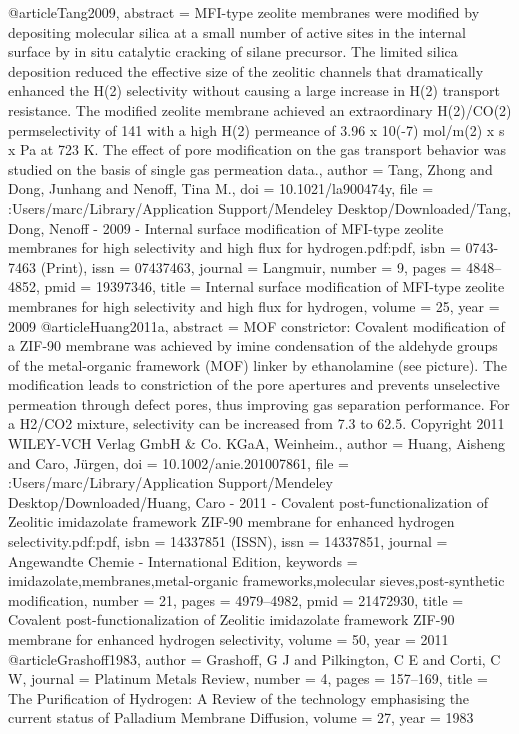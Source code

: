 @article{Tang2009,
abstract = {MFI-type zeolite membranes were modified by depositing molecular silica at a small number of active sites in the internal surface by in situ catalytic cracking of silane precursor. The limited silica deposition reduced the effective size of the zeolitic channels that dramatically enhanced the H(2) selectivity without causing a large increase in H(2) transport resistance. The modified zeolite membrane achieved an extraordinary H(2)/CO(2) permselectivity of 141 with a high H(2) permeance of 3.96 x 10(-7) mol/m(2) x s x Pa at 723 K. The effect of pore modification on the gas transport behavior was studied on the basis of single gas permeation data.},
author = {Tang, Zhong and Dong, Junhang and Nenoff, Tina M.},
doi = {10.1021/la900474y},
file = {:Users/marc/Library/Application Support/Mendeley Desktop/Downloaded/Tang, Dong, Nenoff - 2009 - Internal surface modification of MFI-type zeolite membranes for high selectivity and high flux for hydrogen.pdf:pdf},
isbn = {0743-7463 (Print)},
issn = {07437463},
journal = {Langmuir},
number = {9},
pages = {4848--4852},
pmid = {19397346},
title = {{Internal surface modification of MFI-type zeolite membranes for high selectivity and high flux for hydrogen}},
volume = {25},
year = {2009}
}
@article{Huang2011a,
abstract = {MOF constrictor: Covalent modification of a ZIF-90 membrane was achieved by imine condensation of the aldehyde groups of the metal-organic framework (MOF) linker by ethanolamine (see picture). The modification leads to constriction of the pore apertures and prevents unselective permeation through defect pores, thus improving gas separation performance. For a H2/CO2 mixture, selectivity can be increased from 7.3 to 62.5. Copyright {\textcopyright} 2011 WILEY-VCH Verlag GmbH {\&} Co. KGaA, Weinheim.},
author = {Huang, Aisheng and Caro, J{\"{u}}rgen},
doi = {10.1002/anie.201007861},
file = {:Users/marc/Library/Application Support/Mendeley Desktop/Downloaded/Huang, Caro - 2011 - Covalent post-functionalization of Zeolitic imidazolate framework ZIF-90 membrane for enhanced hydrogen selectivity.pdf:pdf},
isbn = {14337851 (ISSN)},
issn = {14337851},
journal = {Angewandte Chemie - International Edition},
keywords = {imidazolate,membranes,metal-organic frameworks,molecular sieves,post-synthetic modification},
number = {21},
pages = {4979--4982},
pmid = {21472930},
title = {{Covalent post-functionalization of Zeolitic imidazolate framework ZIF-90 membrane for enhanced hydrogen selectivity}},
volume = {50},
year = {2011}
}
@article{Grashoff1983,
author = {Grashoff, G J and Pilkington, C E and Corti, C W},
journal = {Platinum Metals Review},
number = {4},
pages = {157--169},
title = {{The Purification of Hydrogen: A Review of the technology emphasising the current status of Palladium Membrane Diffusion}},
volume = {27},
year = {1983}
}
